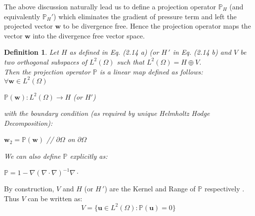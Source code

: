 The above discussion naturally lead us to define a projection operator $\mathbb{P}_H$ (and equivalently $\mathbb{P}_H'$) which eliminates the gradient of pressure term and left the projected vector $\textbf{w}$ to be divergence free. Hence the projection operator maps the vector $\textbf{w}$ into the divergence free vector space. 

\newtheorem{mydef}{Definition}
\begin{mydef}
Let $\textit{H}$ as defined in Eq. (2.14 a) (or $\textit{H} \, '$ in Eq. (2.14 b) and $\textit{V}$ be two orthogonal subspaces of $\textit{L}^2 (\Omega)$ such that $\textit{L}^2 (\Omega) = \textit{H} \oplus \textit{V}$.\\
Then the projection operator $\mathbb{P}$ is a linear map defined as follows:\\
$\forall \textbf{w} \in \textit{L}^2 (\Omega)$
\begin{center}
$\mathbb{P} (\textbf{w}): \textit{L}^2 (\Omega) \rightarrow \textit{H}$ (or $\textit{H}'$)\\
\end{center}
with the boundary condition (as required by unique Helmholtz Hodge Decomposition):
\begin{center}
$\textbf{w}_2 = \mathbb{P} (\textbf{w})$ // $\partial \Omega$ on $\partial \Omega$
\end{center}
We can also define $\mathbb{P}$ explicitly as:
\begin{center}
$\mathbb{P} = 1 - \nabla (\nabla \cdot \nabla)^{-1} \nabla \cdot$\\
\end{center}
\end{mydef}

By construction, $\textit{V}$ and $\textit{H}$ (or $\textit{H} \, '$) are the Kernel and Range of $\mathbb{P}$ respectively .\\
Thus $\textit{V}$ can be written as:
\begin{dmath*}
V = \lbrace { \textbf{u} \in \textit{L}^2 (\Omega): \mathbb{P} (\textbf{u}) = 0} \rbrace 
\end{dmath*}

